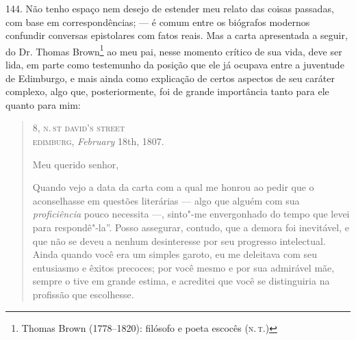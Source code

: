 144. Não tenho espaço nem desejo de estender meu relato das coisas
passadas, com base em correspondências; --- é comum entre os biógrafos
modernos confundir conversas epistolares com fatos reais. Mas a carta
apresentada a seguir, do Dr. Thomas Brown\footnote{Thomas Brown
  (1778--1820): filósofo e poeta escocês (\textsc{n.\,t.})} ao meu pai, nesse
momento crítico de sua vida, deve ser lida, em parte como testemunho da
posição que ele já ocupava entre a juventude de Edimburgo, e mais ainda
como explicação de certos aspectos de seu caráter complexo, algo que,
posteriormente, foi de grande importância tanto para ele quanto para
mim: %

\begin{quote}
\begin{flushright}
8, \textsc{n.\,st david's street}\\
\textsc{edimburg}, \emph{February} 18th, 1807.
\end{flushright}

Meu querido senhor,

Quando vejo a data da carta com a qual me
honrou ao pedir que o aconselhasse em questões literárias --- algo que
alguém com sua \emph{proficiência} pouco necessita ---, sinto"-me
envergonhado do tempo que levei para respondê"-la''. Posso assegurar,
contudo, que a demora foi inevitável, e que não se deveu a nenhum
desinteresse por seu progresso intelectual. Ainda quando você era um
simples garoto, eu me deleitava com seu entusiasmo e êxitos precoces;
por você mesmo e por sua admirável mãe, sempre o tive em grande estima,
e acreditei que você se distinguiria na profissão que escolhesse.


\end{quote}
